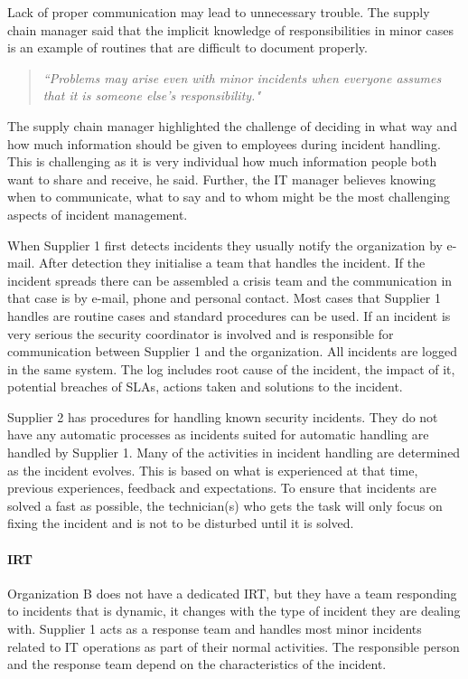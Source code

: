 Lack of proper communication may lead to unnecessary trouble. The supply chain manager said that the implicit knowledge of responsibilities in minor cases is an example of routines that are difficult to document properly.

\begin{quote}
\textit{``Problems may arise even with minor incidents when everyone assumes that it is someone else's responsibility."}
\end{quote}

The supply chain manager highlighted the challenge of deciding in what way and how much information should be given to employees during incident handling. This is challenging as it is very individual how much information people both want to share and receive, he said. Further, the IT manager believes knowing when to communicate, what to say and to whom might be the most challenging aspects of incident management.

When Supplier 1 first detects incidents they usually notify the organization by e-mail. After detection they initialise a team that handles the incident. If the incident spreads there can be assembled a crisis team and the communication in that case is by e-mail, phone and personal contact. Most cases that Supplier 1 handles are routine cases and standard procedures can be used. If an incident is very serious the security coordinator is involved and is responsible for communication between Supplier 1 and the organization. All incidents are logged in the same system. The log includes root cause of the incident, the impact of it, potential breaches of \acp{SLA}, actions taken and solutions to the incident. 

Supplier 2 has procedures for handling known security incidents. They do not have any automatic processes as incidents suited for automatic handling are handled by Supplier 1. Many of the activities in incident handling are determined as the incident evolves. This is based on what is experienced at that time, previous experiences, feedback and expectations. To ensure that incidents are solved a fast as possible, the technician(s) who gets the task will only focus on fixing the incident and is not to be disturbed until it is solved. 

\paragraph{\acl{IRT}}
Organization B does not have a dedicated IRT, but they have a team responding to incidents that is dynamic, it changes with the type of incident they are dealing with. Supplier 1 acts as a response team and handles most minor incidents related to IT operations as part of their normal activities. The responsible person and the response team depend on the characteristics of the incident.   

